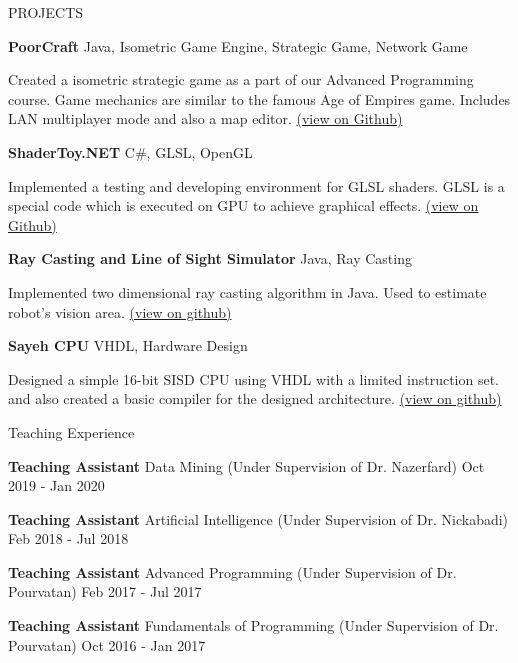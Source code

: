 \documentclass{resume} %
\begin{document}
\begin{rSection}{PROJECTS}
\item \textbf{PoorCraft} {Java, Isometric Game Engine, Strategic Game, Network Game}
\begin{addmargin}[2em]{2em}
Created a isometric strategic game as a part of our Advanced Programming course. Game mechanics are similar to the famous Age of Empires game. Includes LAN multiplayer mode and also a map editor. \href{https://github.com/arminkz/PoorCraft}{(view on Github)}
\end{addmargin}

\item \textbf{ShaderToy.NET} {C\#, GLSL, OpenGL} 
\begin{addmargin}[2em]{2em}
Implemented a testing and developing environment for GLSL shaders. GLSL is a special code which is executed on GPU to achieve graphical effects. \href{https://github.com/arminkz/ShaderToy.NET}{(view on Github)}
\end{addmargin}


\item \textbf{Ray Casting and Line of Sight Simulator} {Java, Ray Casting}
\begin{addmargin}[2em]{2em}
Implemented two dimensional ray casting algorithm in Java. Used to estimate robot's vision area. \href{https://github.com/arminkz/RayCasting}{(view on github)}
\end{addmargin}


\item \textbf{Sayeh CPU} {VHDL, Hardware Design}
\begin{addmargin}[2em]{2em}
Designed a simple 16-bit SISD CPU using VHDL with a limited instruction set. and also created a basic compiler for the designed architecture. \href{https://github.com/arminkz/ShaderToy.NET}{(view on github)}
\end{addmargin}



\end{rSection} 


\begin{rSection}{Teaching Experience}
\vspace{-1.25em}
\item \textbf{Teaching Assistant} {Data Mining (Under Supervision of Dr. Nazerfard)} \hfill Oct 2019 - Jan 2020
\item \textbf{Teaching Assistant} {Artificial Intelligence (Under Supervision of Dr. Nickabadi)} \hfill Feb 2018 - Jul 2018
\item \textbf{Teaching Assistant} {Advanced Programming (Under Supervision of Dr. Pourvatan)} \hfill Feb 2017 - Jul 2017
\item \textbf{Teaching Assistant} {Fundamentals of Programming (Under Supervision of Dr. Pourvatan)} \hfill Oct 2016 - Jan 2017
\\
\end{rSection} 
\end{document}
